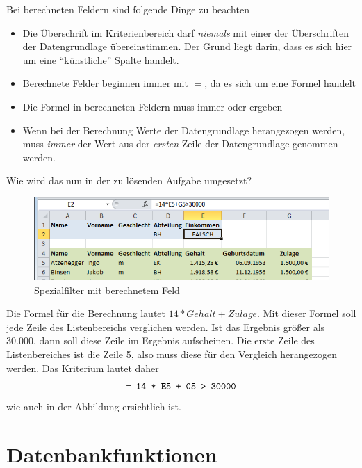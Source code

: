Bei berechneten Feldern sind folgende Dinge zu beachten
\begin{itemize}
	\smallitemize
	\item Die Überschrift im Kriterienbereich darf  \textit{niemals} mit einer der Überschriften der Datengrundlage übereinstimmen. Der Grund liegt darin, dass es sich hier um eine "`künstliche"' Spalte handelt.
	\item Berechnete Felder beginnen immer mit $=$, da es sich um eine Formel handelt
	\item Die Formel in berechneten Feldern muss immer  oder  ergeben
	\item Wenn bei der Berechnung Werte der Datengrundlage herangezogen werden, muss \textit{immer} der Wert aus der \textit{ersten} Zeile der Datengrundlage genommen werden.
\end{itemize}
\enlargethispage{2cm}
Wie wird das nun in der zu lösenden Aufgabe umgesetzt?
	\begin{figure}[H]
		\centering
			\includegraphics[scale=0.7]{images/spezialfilter-berechnet1}
		\caption{Spezialfilter mit berechnetem Feld}
		\label{fig:spezialfilterBerechnetesFeld}
	\end{figure}
	
	
	
Die Formel für die Berechnung lautet $14*Gehalt+Zulage$. Mit dieser Formel soll jede Zeile des Listenbereichs verglichen werden. Ist das Ergebnis größer als 30.000, dann soll diese Zeile im Ergebnis aufscheinen. Die erste Zeile des Listenbereiches ist die Zeile 5, also muss diese für den Vergleich herangezogen werden. Das Kriterium lautet daher
\begin{equation}
	\text{\texttt{= 14 * E5 + G5 > 30000}}
\end{equation}
wie auch in der Abbildung ersichtlich ist.


\section{Datenbankfunktionen}

